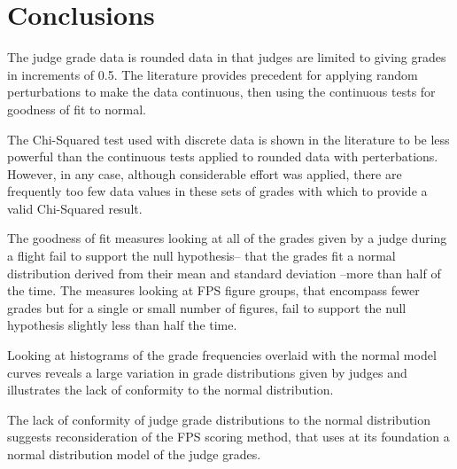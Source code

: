 \section{Conclusions}

The judge grade data is rounded data in that judges are limited to giving
grades in increments of 0.5. The literature provides precedent for applying
random perturbations to make the data continuous, then using the continuous
tests for goodness of fit to normal.

The Chi-Squared test used with discrete data is shown in the literature
to be less powerful than the continuous tests applied to rounded data with
perterbations. However, in any case, although considerable effort was
applied, there are frequently too few data
values in these sets of grades with which to provide a valid Chi-Squared
result.

The goodness of fit measures looking at all of the grades given by a judge
during a flight fail to support the null hypothesis-- that the grades
fit a normal distribution derived from their mean and standard deviation
--more than half of the time.
The measures looking at FPS figure groups, that encompass fewer grades but
for a single or small number of figures, fail to support the null hypothesis
slightly less than half the time.

Looking at histograms of the grade frequencies overlaid with the normal
model curves reveals a large variation in grade distributions given by
judges and illustrates the lack of conformity to the normal distribution.

The lack of conformity of judge grade distributions to the normal distribution
suggests reconsideration of the FPS scoring method, that uses at its
foundation a normal distribution model of the judge grades.
